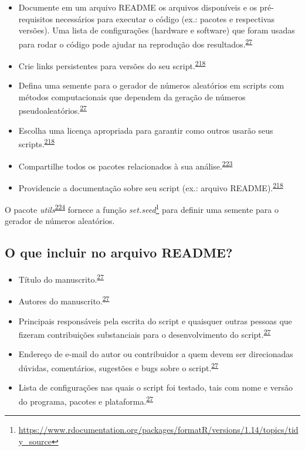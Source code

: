 \documentclass[
  a4paper,
]{book}
\renewcommand{\href}[2]{#2\footnote{\url{#1}}}
\newenvironment{infobox}[1]
  {
  \begin{itemize}
  \renewcommand{\labelitemi}{
    \raisebox{-.7\height}[0pt][0pt]{
      {\setkeys{Gin}{width=3em,keepaspectratio}
        \texttt{[image: \#1]}}
    }
  }
  \setlength{\fboxsep}{1em}
  \begin{blackbox}
  \item
  }
  {
  \end{blackbox}
  \end{itemize}
  }
\begin{document}
\begin{itemize}
\item
  Documente em um arquivo README os arquivos disponíveis e os pré-requisitos necessários para executar o código (ex.: pacotes e respectivas versões). Uma lista de configurações (hardware e software) que foram usadas para rodar o código pode ajudar na reprodução dos resultados.\textsuperscript{\protect\hyperlink{ref-hofner2015}{27}}
\item
  Crie links persistentes para versões do seu script.\textsuperscript{\protect\hyperlink{ref-Eglen2017}{218}}
\item
  Defina uma semente para o gerador de números aleatórios em scripts com métodos computacionais que dependem da geração de números pseudoaleatórios.\textsuperscript{\protect\hyperlink{ref-hofner2015}{27}}
\item
  Escolha uma licença apropriada para garantir como outros usarão seus scripts.\textsuperscript{\protect\hyperlink{ref-Eglen2017}{218}}
\item
  Compartilhe todos os pacotes relacionados à sua análise.\textsuperscript{\protect\hyperlink{ref-Zhao2023}{223}}
\item
  Providencie a documentação sobre seu script (ex.: arquivo README).\textsuperscript{\protect\hyperlink{ref-Eglen2017}{218}}
\end{itemize}

\begin{infobox}{images/Rlogo}
O pacote \emph{utils}\textsuperscript{\protect\hyperlink{ref-utils}{224}} fornece a função \href{https://www.rdocumentation.org/packages/formatR/versions/1.14/topics/tidy_source}{\emph{set.seed}} para definir uma semente para o gerador de números aleatórios.

\end{infobox}

\hypertarget{o-que-incluir-no-arquivo-readme}{%
\subsection{O que incluir no arquivo README?}\label{o-que-incluir-no-arquivo-readme}}

\begin{itemize}
\item
  Título do manuscrito.\textsuperscript{\protect\hyperlink{ref-hofner2015}{27}}
\item
  Autores do manuscrito.\textsuperscript{\protect\hyperlink{ref-hofner2015}{27}}
\item
  Principais responsáveis pela escrita do script e quaisquer outras pessoas que fizeram contribuições substanciais para o desenvolvimento do script.\textsuperscript{\protect\hyperlink{ref-hofner2015}{27}}
\item
  Endereço de e-mail do autor ou contribuidor a quem devem ser direcionadas dúvidas, comentários, sugestões e bugs sobre o script.\textsuperscript{\protect\hyperlink{ref-hofner2015}{27}}
\item
  Lista de configurações nas quais o script foi testado, tais com nome e versão do programa, pacotes e plataforma.\textsuperscript{\protect\hyperlink{ref-hofner2015}{27}}
\end{itemize}
\end{document}
